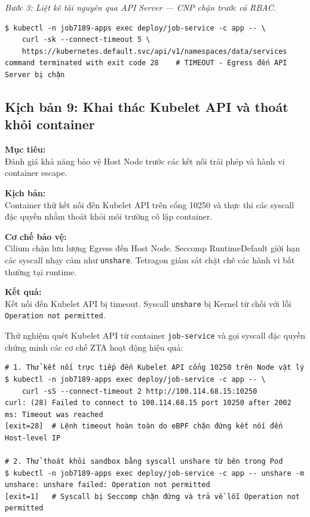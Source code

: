 \textit{Bước 3: Liệt kê tài nguyên qua API Server --- CNP chặn trước cả RBAC.}
\begin{listing}[H]
\caption{Truy vấn API Server để liệt kê dịch vụ bị CNP chặn Egress}
\label{lst:kb8_api_cmd}
\begin{verbatim}
$ kubectl -n job7189-apps exec deploy/job-service -c app -- \
    curl -sk --connect-timeout 5 \
    https://kubernetes.default.svc/api/v1/namespaces/data/services
command terminated with exit code 28    # TIMEOUT - Egress đến API Server bị chặn
\end{verbatim}
\end{listing}


\subsection{Kịch bản 9: Khai thác Kubelet API và thoát khỏi container}
\label{subsec:kb9_kubelet}

\textbf{Mục tiêu:}\\
Đánh giá khả năng bảo vệ Host Node trước các kết nối trái phép và hành vi container escape.

\textbf{Kịch bản:}\\
Container thử kết nối đến Kubelet API trên cổng 10250 và thực thi các syscall đặc quyền nhằm thoát khỏi môi trường cô lập container.

\textbf{Cơ chế bảo vệ:}\\
Cilium chặn lưu lượng Egress đến Host Node. Seccomp RuntimeDefault giới hạn các syscall nhạy cảm như \texttt{unshare}. Tetragon giám sát chặt chẽ các hành vi bất thường tại runtime.

\textbf{Kết quả:}\\
Kết nối đến Kubelet API bị timeout. Syscall \texttt{unshare} bị Kernel từ chối với lỗi \texttt{Operation not permitted}.


Thử nghiệm quét Kubelet API từ container \texttt{job-service} và gọi syscall đặc quyền chứng minh các cơ chế ZTA hoạt động hiệu quả:

\begin{listing}[H]
\begin{verbatim}
# 1. Thử kết nối trực tiếp đến Kubelet API cổng 10250 trên Node vật lý
$ kubectl -n job7189-apps exec deploy/job-service -c app -- \
    curl -sS --connect-timeout 2 http://100.114.68.15:10250
curl: (28) Failed to connect to 100.114.68.15 port 10250 after 2002 ms: Timeout was reached
[exit=28]  # Lệnh timeout hoàn toàn do eBPF chặn đứng kết nối đến Host-level IP

# 2. Thử thoát khỏi sandbox bằng syscall unshare từ bên trong Pod
$ kubectl -n job7189-apps exec deploy/job-service -c app -- unshare -m
unshare: unshare failed: Operation not permitted
[exit=1]   # Syscall bị Seccomp chặn đứng và trả về lỗi Operation not permitted
\end{verbatim}
\caption{Kết quả quét Kubelet API bị TIMEOUT và syscall bị Seccomp chặn đứng}
\label{lst:kb9_syscall_cmd}
\end{listing}


